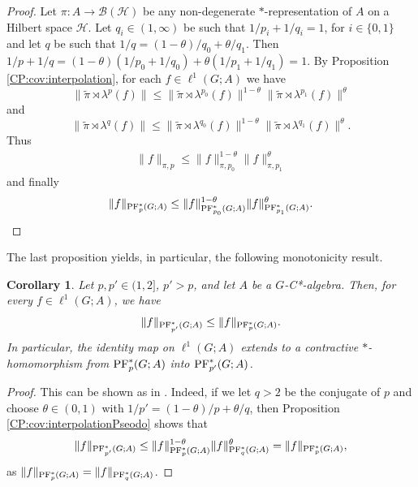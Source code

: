 \documentclass[12pt]{amsart}
\newtheorem{cor}[thm]{Corollary}
\theoremstyle{definition}
\theoremstyle{remark}
\numberwithin{equation}{section}
\begin{document}
\begin{proof}
	Let $\pi\colon A \to \mathcal{B}(\mathcal{H})$ be any non-degenerate $*$-representation of $A$ on a
	Hilbert space $\mathcal{H}$. Let $q_i\in (1,\infty)$ be such that $1/p_i + 1/q_i =1$, for $i \in \{ 0 ,1 \}$ and
	let $q$  be such that $1/q = (1-\theta) /q_0 + \theta /q_1$. Then
	$1/p + 1/q = (1-\theta)(1/p_0 + 1/q_0)+ \theta(1/p_1+1/q_1) = 1$. By
	Proposition \ref{CP:cov:interpolation}, for each  $f\in \ell^1(G;A)$ we have
	\[
		\|\tilde{\pi}\rtimes \lambda^p(f)\| \leq \|\tilde{\pi}\rtimes \lambda^{p_0}(f) \|^{1-\theta}
		 \|\tilde{\pi}\rtimes \lambda^{p_1} (f)\|^{\theta} \] and \[
		\|\tilde{\pi}\rtimes \lambda^q(f)\| \leq \|\tilde{\pi}\rtimes \lambda^{q_0}(f) \|^{1-\theta}
		 \|\tilde{\pi}\rtimes \lambda^{q_1} (f)\|^{\theta}.
\]
Thus
	\begin{align*}
		\| f \|_{\pi,p} \leq \|f\|_{\pi,p_0}^{1-\theta} \|f\|_{\pi,p_1}^{\theta}
	\end{align*}
and finally
	\begin{align*}
		\|f\|_{\textup{PF}^*_p(G;A)}\leq \|f\|_{\textup{PF}^*_{p_0}(G;A)}^{1-\theta}\|f\|_{\textup{PF}^*_{p_1}(G;A)}^\theta.
	\end{align*}
\end{proof}



The last proposition yields, in particular, the following monotonicity result.

\begin{cor} \label{prop:monotone}
  Let $p, p' \in (1,2]$, $p' >p$, and let $A$ be a $G$-C*-algebra. Then, for every $f \in \ell^1(G;A)$, we have
  \[\|f\|_{\textup{PF}^*_{p'}(G;A)} \leq \|f\|_{\textup{PF}^*_{p}(G;A)}.\]
  In particular, the identity map on $\ell^1(G;A)$ extends to a contractive $*$-homomorphism from 
  $\textup{PF}^*_{p}(G;A)$ into $\textup{PF}^*_{p'}(G;A)$.
\end{cor}
\begin{proof}
This can be shown as in \cite[Proposition 4.5]{SW1}. Indeed, if we let $q> 2$ be the conjugate of $p$ and choose $\theta\in(0,1)$ with $1/p'=(1-\theta)/p+\theta/q$, then Proposition \ref{CP:cov:interpolationPseodo} shows that
\begin{align*}
   		\|f \|_{\textup{PF}^*_{p'}(G;A)} \leq \| f \|_{\textup{PF}^*_{p}(G;A)}^{1-\theta}\|f\|_{\textup{PF}_{q}^*(G;A)}^\theta=\| f \|_{\textup{PF}^*_{p}(G;A)},
\end{align*}
as $\| f \|_{\textup{PF}^*_{p}(G;A)}=\| f \|_{\textup{PF}^*_{q}(G;A)}$.
\end{proof}
\end{document}
